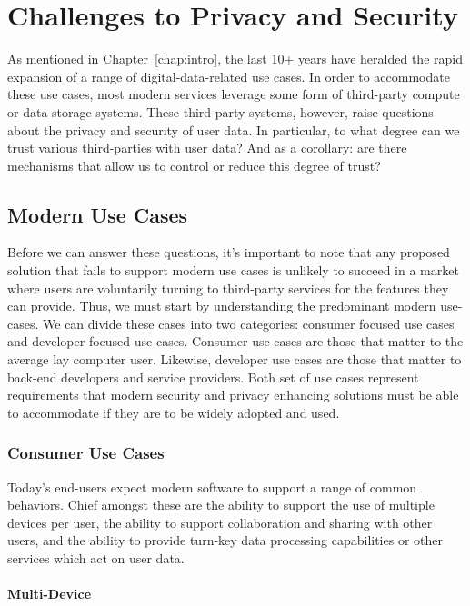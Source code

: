 \chapter{Challenges to Privacy and Security}
\label{chap:challenges}

As mentioned in Chapter~\ref{chap:intro}, the last 10+ years have
heralded the rapid expansion of a range of digital-data-related use
cases. In order to accommodate these use cases, most modern services
leverage some form of third-party compute or data storage
systems. These third-party systems, however, raise questions about the
privacy and security of user data. In particular, to what degree can
we trust various third-parties with user data? And as a corollary: are
there mechanisms that allow us to control or reduce this degree of
trust?

\section{Modern Use Cases}
\label{chap:challenges:usecases}

Before we can answer these questions, it's important to note that any
proposed solution that fails to support modern use cases is unlikely
to succeed in a market where users are voluntarily turning to
third-party services for the features they can provide. Thus, we must
start by understanding the predominant modern use-cases. We can divide
these cases into two categories: consumer focused use cases and
developer focused use-cases. Consumer use cases are those that matter
to the average lay computer user. Likewise, developer use cases are
those that matter to back-end developers and service providers.  Both
set of use cases represent requirements that modern security and
privacy enhancing solutions must be able to accommodate if they are to
be widely adopted and used.

\subsection{Consumer Use Cases}

Today's end-users expect modern software to support a range of common
behaviors. Chief amongst these are the ability to support the use of
multiple devices per user, the ability to support collaboration and
sharing with other users, and the ability to provide turn-key data
processing capabilities or other services which act on user data.

\subsubsection{Multi-Device}

